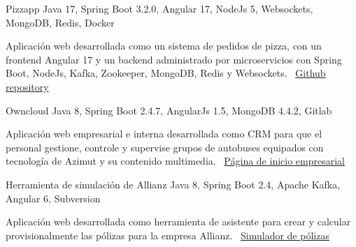 \documentclass[]{awesome-cv}
\begin{document}
\vspace{35mm}
\begin{cventries}	
	\vspace{1mm}
	\cventry
	{}
	{Pizzapp}
	{Java 17, Spring Boot 3.2.0, Angular 17, NodeJs 5, Websockets, MongoDB, Redis, Docker \vspace{-5mm}}
	{}
	{\begin{sectionnormaltext}
		\item {Aplicación web desarrollada como un sistema de pedidos de pizza, con un frontend Angular 17 y un backend administrado por microservicios con Spring Boot, NodeJs, Kafka, Zookeeper, MongoDB, Redis y Websockets. 
		\newline \faLink\ \href{https://github.com/flautarian/pizzapp}{Github repository}}
	\end{sectionnormaltext}}

	\vspace{-3mm}
	\cventry
	{}
	{Owncloud \vspace{-5mm}}
	{Java 8, Spring Boot 2.4.7, AngularJs 1.5, MongoDB 4.4.2, Gitlab \vspace{-5mm}}
	{}
	{\begin{cvsectionnormaltext}
		\item {Aplicación web empresarial e interna desarrollada como CRM para que el personal gestione, controle y supervise grupos de autobuses equipados con tecnología de Azimut y su contenido multimedia. 
		\newline \faLink\ \href{https://www.azimutelectronics.com}{Página de inicio empresarial}}
	\end{cvsectionnormaltext}}

	\vspace{-3mm}
	\cventry
	{}
	{Herramienta de simulación de Allianz \vspace{-5mm}}
	{Java 8, Spring Boot 2.4, Apache Kafka, Angular 6, Subversion \vspace{-5mm}}
	{}
	{\begin{cvsectionnormaltext}
		\item{Aplicación web desarrollada como herramienta de asistente para crear y calcular provisionalmente las pólizas para la empresa Allianz.
      \newline \faLink\ \href{https://www.allianzdirect.es/seguro-de-coche/calcular-precio/}{Simulador de pólizas}}
	\end{cvsectionnormaltext}}
	

\end{cventries}
\end{document}

